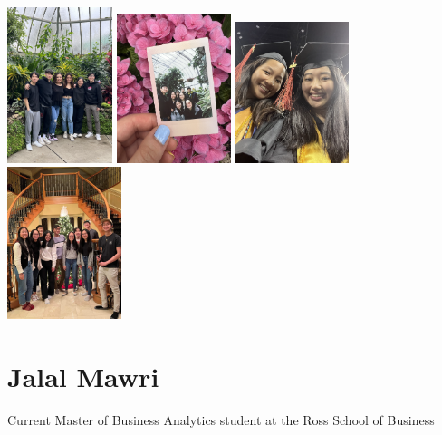 \documentclass[
]{book}
\theoremstyle{definition}
\theoremstyle{definition}
\theoremstyle{definition}
\theoremstyle{definition}
\theoremstyle{remark}
\begin{document}
\includegraphics[width=0.23\textwidth,height=\textheight]{dtw.png}
\includegraphics[width=0.25\textwidth,height=\textheight]{belleisle.png}
\includegraphics[width=0.25\textwidth,height=\textheight]{econ.png}
\includegraphics[width=0.25\textwidth,height=\textheight]{christmas.JPG}

\hypertarget{jalal-mawri}{%
\section{Jalal Mawri}\label{jalal-mawri}}

Current Master of Business Analytics student at the Ross School of Business
\end{document}
